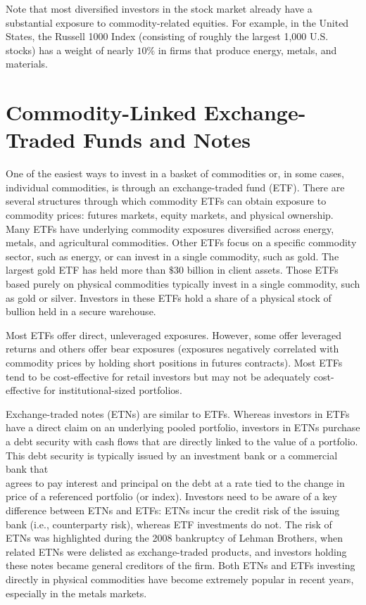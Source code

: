 \documentclass[11pt]{article}
\begin{document}
Note that most diversified investors in the stock market already have a substantial exposure to commodity-related equities. For example, in the United States, the Russell 1000 Index (consisting of roughly the largest 1,000 U.S. stocks) has a weight of nearly $10 \%$ in firms that produce energy, metals, and materials.

\section*{Commodity-Linked Exchange-Traded Funds and Notes}
One of the easiest ways to invest in a basket of commodities or, in some cases, individual commodities, is through an exchange-traded fund (ETF). There are several structures through which commodity ETFs can obtain exposure to commodity prices: futures markets, equity markets, and physical ownership. Many ETFs have underlying commodity exposures diversified across energy, metals, and agricultural commodities. Other ETFs focus on a specific commodity sector, such as energy, or can invest in a single commodity, such as gold. The largest gold ETF has held more than $\$ 30$ billion in client assets. Those ETFs based purely on physical commodities typically invest in a single commodity, such as gold or silver. Investors in these ETFs hold a share of a physical stock of bullion held in a secure warehouse.

Most ETFs offer direct, unleveraged exposures. However, some offer leveraged returns and others offer bear exposures (exposures negatively correlated with commodity prices by holding short positions in futures contracts). Most ETFs tend to be cost-effective for retail investors but may not be adequately cost-effective for institutional-sized portfolios.

Exchange-traded notes (ETNs) are similar to ETFs. Whereas investors in ETFs have a direct claim on an underlying pooled portfolio, investors in ETNs purchase a debt security with cash flows that are directly linked to the value of a portfolio. This debt security is typically issued by an investment bank or a commercial bank that\\
agrees to pay interest and principal on the debt at a rate tied to the change in price of a referenced portfolio (or index). Investors need to be aware of a key difference between ETNs and ETFs: ETNs incur the credit risk of the issuing bank (i.e., counterparty risk), whereas ETF investments do not. The risk of ETNs was highlighted during the 2008 bankruptcy of Lehman Brothers, when related ETNs were delisted as exchange-traded products, and investors holding these notes became general creditors of the firm. Both ETNs and ETFs investing directly in physical commodities have become extremely popular in recent years, especially in the metals markets.
\end{document}
